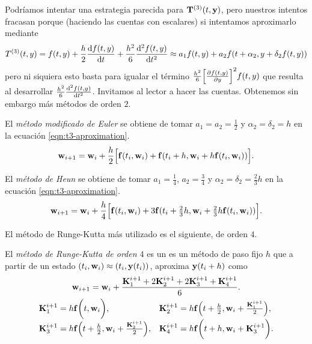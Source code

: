 Podríamos intentar una estrategia parecida para $\vb{T}^{(3)}(t, \vb{y})$,
pero nuestros intentos fracasan porque
(haciendo las cuentas con escalares)
si intentamos aproximarlo mediante
\begin{equation}\label{eqn:t3-aproximation}
    T^{(3)}(t,y) =
    f(t,y) + \frac{h}{2}\dv{f(t,y)}{t} + \frac{h^2}{6}\dv[2]{f(t,y)}{t} \approx
    a_1f(t,y) + a_2f(t+\alpha_2, y+\delta_2f(t,y))
\end{equation}
pero ni siquiera esto basta para igualar el término
$\frac{h^2}{6}\qty[\pdv{f(t, y)}{y}]^2f(t,y)$
que resulta al desarrollar $\frac{h^2}{6}\dv[2]{f(t, y)}{t}$.
Invitamos al lector a hacer las cuentas.
Obtenemos sin embargo más métodos de orden $2$.

\begin{method}
    El \emph{método modificado de Euler} se obtiene de
    tomar $a_1 = a_2 = \frac{1}{2}$ y $\alpha_2 = \delta_2 = h$
    en la ecuación  \eqref{eqn:t3-aproximation}.
    \begin{equation*}
        \vb{w}_{i+1} = \vb{w}_i + \frac{h}{2}\qty\Big[
            \vb{f}(t_i, \vb{w}_i) + \vb{f}(t_i + h, \vb{w}_i + h\vb{f}(t_i,\vb{w}_i))
        ].
    \end{equation*}
\end{method}

\begin{method}
    El \emph{método de Heun} se obtiene de tomar $a_1 = \frac{1}{4}$,
    $a_2 = \frac{3}{4}$ y $\alpha_2 = \delta_2 = \frac{2}{3}h$
    en la ecuación \eqref{eqn:t3-aproximation}.
    \begin{equation*}
        \vb{w}_{i+1} = \vb{w}_i + \frac{h}{4}\qty\Big[
            \vb{f}(t_i, \vb{w}_i) +
            3\vb{f}(t_i + \tfrac{2}{3}h, \vb{w}_i + \tfrac{2}{3}h\vb{f}(t_i, \vb{w}_i))
        ].
    \end{equation*}

\end{method}

El método de Runge-Kutta más utilizado es el siguiente, de orden $4$.

\begin{method}\label{met:euler}
    \newcommand{\K}{\vb{K}}

    El \emph{método de Runge-Kutta de orden $4$}
    es un es un método de paso fijo $h$ que
    a partir de un estado $(t_i, \vb{w}_i) \approx (t_i, \vb{y}(t_i))$,
    aproxima $\vb{y}(t_i + h)$ como
    \begin{gather*}
        \vw_{i+1} = \vw_i + \frac{
            \K_1^{i+1} + 2\K_2^{i+1} + 2\K_3^{i+1} + \K_4^{i+1}
        }{6}. \\
        \begin{array}{ll}
        \K_1^{i+1} = h\vf\qty\bigg(t, \vw_i), &
        \K_2^{i+1} = h\vf\qty(t + \frac{h}{2}, \vw_i+ \frac{\K_1^{i+1}}{2}), \\
        \K_3^{i+1} = h\vf\qty(t + \frac{h}{2}, \vw_i+ \frac{\K_2^{i+1}}{2}), &
        \K_4^{i+1} = h\vf\qty\bigg(t + h, \vw_i + \K_3^{i+1}).
        \end{array}
    \end{gather*}
\end{method}

